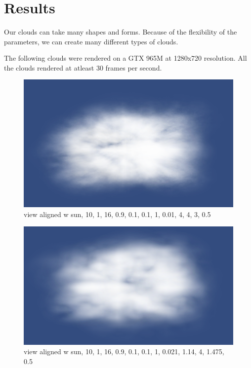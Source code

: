 \newpage
\section{Results}\paragraph{}
Our clouds can take many shapes and forms. Because of the flexibility of the parameters, we can create many different types of clouds.

The following clouds were rendered on a GTX 965M at 1280x720 resolution. All the clouds rendered at atleast 30 frames per second.

\begin{figure}[h]
\centering
\includegraphics[width=\textwidth]{../res/res1.png}
\caption{view aligned w sun, 10, 1, 16, 0.9, 0.1, 0.1, 1, 0.01, 4, 4, 3, 0.5}
\end{figure}

\begin{figure}[h]
\centering
\includegraphics[width=\textwidth]{../res/res2.png}
\caption{view aligned w sun, 10, 1, 16, 0.9, 0.1, 0.1, 1, 0.021, 1.14, 4, 1.475, 0.5}
\end{figure}

